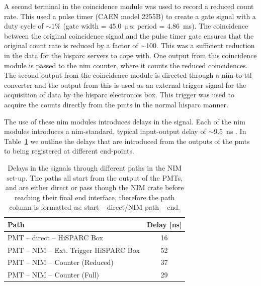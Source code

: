 A second terminal in the coincidence module was used to record a reduced count rate. This used a pulse timer (CAEN model 2255B) to create a gate signal with a duty cycle of $\sim$$1\%$ (gate width = $45.0 \, \upmu\mathrm{s}$; period = $4.86$~ms). The coincidence between the original coincidence signal and the pulse timer gate ensures that the original count rate is reduced by a factor of $\sim$100. This was a sufficient reduction in the data for the \gls{hisparc} servers to cope with. One output from this coincidence module is passed to the \gls{nim} counter, where it counts the reduced coincidences. The second output from the coincidence module is directed through a \gls{nim}-to-\gls{ttl} converter and the output from this is used as an external trigger signal for the acquisition of data by the \gls{hisparc} electronics box. This trigger was used to acquire the counts directly from the \glspl{pmt} in the normal \gls{hisparc} manner.%

The use of these \gls{nim} modules introduces delays in the signal. Each of the \gls{nim} modules introduces a \gls{nim}-standard, typical input-output delay of $\sim$9.5~ns \citep{lecroy_lecroy_1996, caen_technical_2011}. In Table~\ref{tab:HS_14008_delays} we outline the delays that are introduced from the outputs of the \glspl{pmt} to being registered at different end-points.

\vspace{1em}

\begin{table}[ht!]
	\begin{center}
		\caption{Delays in the signals through different paths in the NIM set-up. The paths all start from the output of the PMTs, and are either direct or pass though the NIM crate before reaching their final end interface, therefore the path column is formatted as: start -- direct/NIM path -- end.}
		\label{tab:HS_14008_delays}
		\begin{tabular}{l c }
			\hline 
			{\bf Path} & {\bf Delay [ns]} \\ 
			\hline 
			PMT -- direct -- HiSPARC Box &  16 \\ 
			PMT -- NIM -- Ext. Trigger HiSPARC Box & 52 \\ 
			PMT -- NIM -- Counter (Reduced) & 37 \\ 
			PMT -- NIM -- Counter (Full) & 29 \\ 
			\hline 
		\end{tabular} 
	\end{center}
\end{table}

